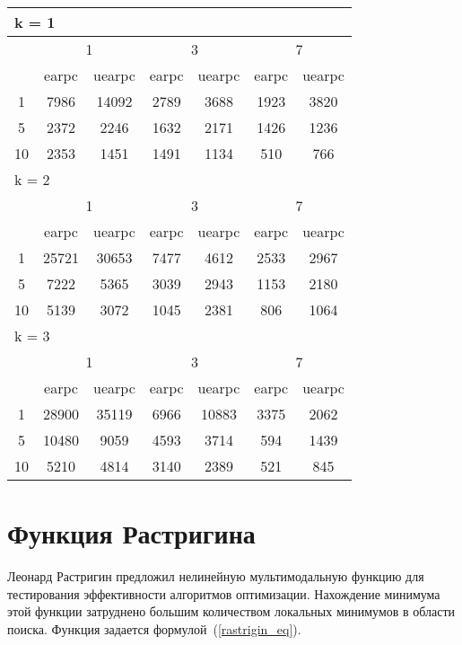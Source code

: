 \begin{table}
\begin{tabular}{|*7{c|}}
\hline
\multicolumn{7}{|l|}{k = 1} \\
\hline
\multirow{2}{*}{\diagbox{$\mu$}{$\lambda$}} & \multicolumn{2}{c|}{1} & \multicolumn{2}{c|}{3} & \multicolumn{2}{c|}{7} \\
\cline{2-7}
 & earpc & uearpc & earpc & uearpc & earpc & uearpc \\
\hline
1 & 7986 & 14092 & 2789 & 3688 & 1923 & 3820 \\
\hline
5 & 2372 & 2246 & 1632 & 2171 & 1426 & 1236 \\
\hline
10 & 2353 & 1451 & 1491 & 1134 & 510 & 766 \\
\hline
\multicolumn{7}{|l|}{k = 2} \\
\hline
\multirow{2}{*}{\diagbox{$\mu$}{$\lambda$}} & \multicolumn{2}{c|}{1} & \multicolumn{2}{c|}{3} & \multicolumn{2}{c|}{7} \\
\cline{2-7}
 & earpc & uearpc & earpc & uearpc & earpc & uearpc \\
\hline
1 & 25721 & 30653 & 7477 & 4612 & 2533 & 2967 \\
\hline
5 & 7222 & 5365 & 3039 & 2943 & 1153 & 2180 \\
\hline
10 & 5139 & 3072 & 1045 & 2381 & 806 & 1064 \\
\hline
\multicolumn{7}{|l|}{k = 3} \\
\hline
\multirow{2}{*}{\diagbox{$\mu$}{$\lambda$}} & \multicolumn{2}{c|}{1} & \multicolumn{2}{c|}{3} & \multicolumn{2}{c|}{7} \\
\cline{2-7}
 & earpc & uearpc & earpc & uearpc & earpc & uearpc \\
\hline
1 & 28900 & 35119 & 6966 & 10883 & 3375 & 2062 \\
\hline
5 & 10480 & 9059 & 4593 & 3714 & 594 & 1439 \\
\hline
10 & 5210 & 4814 & 3140 & 2389 & 521 & 845 \\
\hline
\end{tabular}
\end{table}


\section{Функция Растригина}

Леонард Растригин предложил нелинейную мультимодальную функцию для тестирования эффективности алгоритмов оптимизации. Нахождение минимума этой функции затруднено большим количеством локальных минимумов в области поиска. Функция задается формулой~(\ref{rastrigin_eq}).

